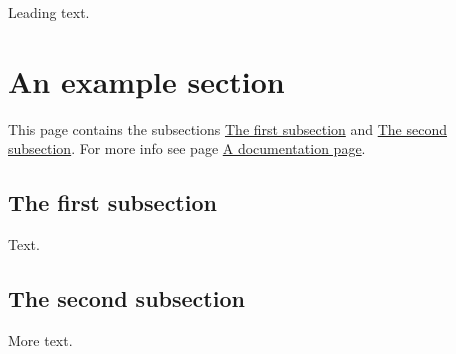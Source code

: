 Leading text. \hypertarget{page2_sec}{}\section{An example section}\label{page2_sec}
This page contains the subsections \hyperlink{page2_subsection1}{The first subsection} and \hyperlink{page2_subsection2}{The second subsection}. For more info see page \hyperlink{page2}{A documentation page}. \hypertarget{page2_subsection1}{}\subsection{The first subsection}\label{page2_subsection1}
Text. \hypertarget{page2_subsection2}{}\subsection{The second subsection}\label{page2_subsection2}
More text. 